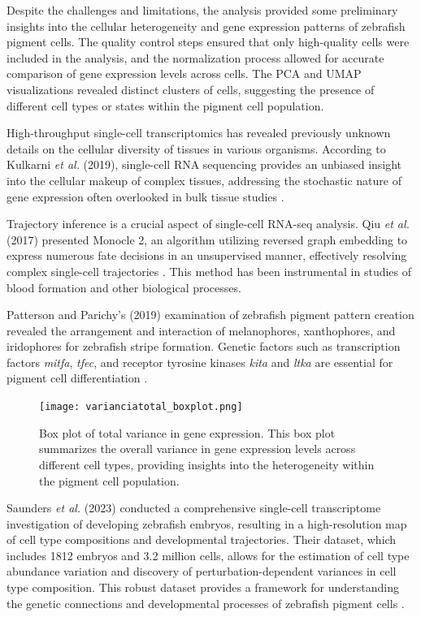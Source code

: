 \documentclass[runningheads]{llncs}
\begin{document}
Despite the challenges and limitations, the analysis provided some preliminary insights into the cellular heterogeneity and gene expression patterns of zebrafish pigment cells. The quality control steps ensured that only high-quality cells were included in the analysis, and the normalization process allowed for accurate comparison of gene expression levels across cells. The PCA and UMAP visualizations revealed distinct clusters of cells, suggesting the presence of different cell types or states within the pigment cell population.

High-throughput single-cell transcriptomics has revealed previously unknown details on the cellular diversity of tissues in various organisms. According to Kulkarni \textit{et al.} (2019), single-cell RNA sequencing provides an unbiased insight into the cellular makeup of complex tissues, addressing the stochastic nature of gene expression often overlooked in bulk tissue studies \cite{kulkarni2019beyond}.

Trajectory inference is a crucial aspect of single-cell RNA-seq analysis. Qiu \textit{et al.} (2017) presented Monocle 2, an algorithm utilizing reversed graph embedding to express numerous fate decisions in an unsupervised manner, effectively resolving complex single-cell trajectories \cite{qiu2017reversed}. This method has been instrumental in studies of blood formation and other biological processes.

Patterson and Parichy's (2019) examination of zebrafish pigment pattern creation revealed the arrangement and interaction of melanophores, xanthophores, and iridophores for zebrafish stripe formation. Genetic factors such as transcription factors \textit{mitfa}, \textit{tfec}, and receptor tyrosine kinases \textit{kita} and \textit{ltka} are essential for pigment cell differentiation \cite{patterson2019zebrafish}.

\begin{figure}[H]
\centering
\texttt{[image: varianciatotal\_boxplot.png]}
\caption{Box plot of total variance in gene expression. This box plot summarizes the overall variance in gene expression levels across different cell types, providing insights into the heterogeneity within the pigment cell population.}
\label{results 1}
\end{figure}

Saunders \textit{et al.} (2023) conducted a comprehensive single-cell transcriptome investigation of developing zebrafish embryos, resulting in a high-resolution map of cell type compositions and developmental trajectories. Their dataset, which includes 1812 embryos and 3.2 million cells, allows for the estimation of cell type abundance variation and discovery of perturbation-dependent variances in cell type composition. This robust dataset provides a framework for understanding the genetic connections and developmental processes of zebrafish pigment cells \cite{saunders2023embryo}.
\end{document}

